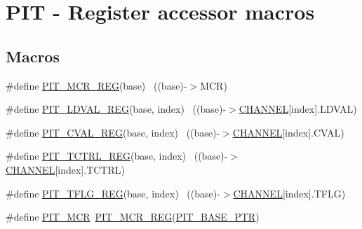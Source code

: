 \hypertarget{group___p_i_t___register___accessor___macros}{}\section{P\+IT -\/ Register accessor macros}
\label{group___p_i_t___register___accessor___macros}
\subsection*{Macros}
\begin{DoxyCompactItemize}
\item 
\#define \hyperlink{group___p_i_t___register___accessor___macros_ga557d2712a651961dcd5ffc4f04673239}{P\+I\+T\+\_\+\+M\+C\+R\+\_\+\+R\+EG}(base)                                            ~((base)-\/$>$M\+CR)
\item 
\#define \hyperlink{group___p_i_t___register___accessor___macros_ga2fe8b64df48316de72596736de1bbb00}{P\+I\+T\+\_\+\+L\+D\+V\+A\+L\+\_\+\+R\+EG}(base,  index)                            ~((base)-\/$>$\hyperlink{samr21__xpro_200std__low__power__mode_200std__low__power__mode_8c_ace6a11e892466500d47d1f45f042bc53}{C\+H\+A\+N\+N\+EL}\mbox{[}index\mbox{]}.L\+D\+V\+AL)
\item 
\#define \hyperlink{group___p_i_t___register___accessor___macros_ga0513f6bb6550d10e2877f1918dfdc80e}{P\+I\+T\+\_\+\+C\+V\+A\+L\+\_\+\+R\+EG}(base,  index)                              ~((base)-\/$>$\hyperlink{samr21__xpro_200std__low__power__mode_200std__low__power__mode_8c_ace6a11e892466500d47d1f45f042bc53}{C\+H\+A\+N\+N\+EL}\mbox{[}index\mbox{]}.C\+V\+AL)
\item 
\#define \hyperlink{group___p_i_t___register___accessor___macros_ga4c2f72ad95fb4104612b319ce7a7d4d9}{P\+I\+T\+\_\+\+T\+C\+T\+R\+L\+\_\+\+R\+EG}(base,  index)                            ~((base)-\/$>$\hyperlink{samr21__xpro_200std__low__power__mode_200std__low__power__mode_8c_ace6a11e892466500d47d1f45f042bc53}{C\+H\+A\+N\+N\+EL}\mbox{[}index\mbox{]}.T\+C\+T\+RL)
\item 
\#define \hyperlink{group___p_i_t___register___accessor___macros_ga79831c0452f96ca1b71292189ad382eb}{P\+I\+T\+\_\+\+T\+F\+L\+G\+\_\+\+R\+EG}(base,  index)                              ~((base)-\/$>$\hyperlink{samr21__xpro_200std__low__power__mode_200std__low__power__mode_8c_ace6a11e892466500d47d1f45f042bc53}{C\+H\+A\+N\+N\+EL}\mbox{[}index\mbox{]}.T\+F\+LG)
\item 
\#define \hyperlink{group___p_i_t___register___accessor___macros_gad6118acee6a1de4d21ceaae97156642b}{P\+I\+T\+\_\+\+M\+CR}~\hyperlink{group___p_i_t___register___accessor___macros_ga557d2712a651961dcd5ffc4f04673239}{P\+I\+T\+\_\+\+M\+C\+R\+\_\+\+R\+EG}(\hyperlink{group___p_i_t___peripheral_ga70be45f58402a8e6d2ce4df7b23aa41c}{P\+I\+T\+\_\+\+B\+A\+S\+E\+\_\+\+P\+TR})

\end{DoxyCompactItemize}
